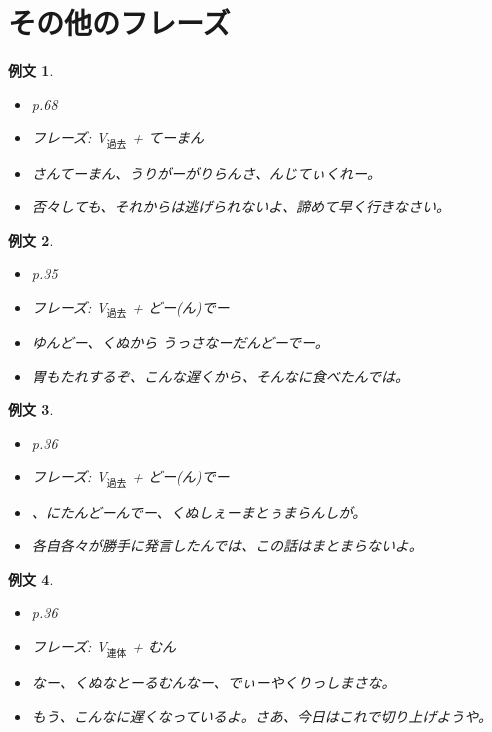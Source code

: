 \documentclass[a4j,12pt]{jarticle}
\theoremstyle{break}
\newtheorem{example}{例文}
\begin{document}
\section{その他のフレーズ}
\begin{example}
  \begin{itemize}
  \item p.68
  \item フレーズ: V$_{過去}$ + てーまん
  \item {}さんてーまん、うりがーがりらんさ、んじてぃくれー。
  \item 否々しても、それからは逃げられないよ、諦めて早く行きなさい。
  \end{itemize}
\end{example}
\begin{example}
  \begin{itemize}
  \item p.35
  \item フレーズ: V$_{過去}$ + どー(ん)でー
  \item {}ゆんどー、くぬから うっさなーだんどーでー。
  \item 胃もたれするぞ、こんな遅くから、そんなに食べたんでは。
  \end{itemize}
\end{example}
\begin{example}
  \begin{itemize}
  \item p.36
  \item フレーズ: V$_{過去}$ + どー(ん)でー
  \item {}、にたんどーんでー、くぬしぇーまとぅまらんしが。
  \item 各自各々が勝手に発言したんでは、この話はまとまらないよ。
  \end{itemize}
\end{example}
\begin{example}
  \begin{itemize}
  \item p.36
  \item フレーズ: V$_{連体}$ + むん
  \item なー、くぬなとーるむんなー、でぃーやくりっしまさな。
  \item もう、こんなに遅くなっているよ。さあ、今日はこれで切り上げようや。
  \end{itemize}
\end{example}
\end{document}

